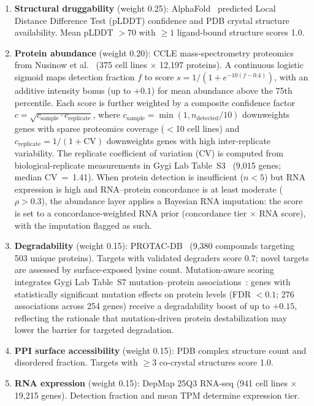 \documentclass[times, twoside, watermark]{zHenriquesLab-StyleBioRxiv}
\begin{document}
\begin{enumerate}
\item \textbf{Structural druggability} (weight 0.25): AlphaFold~\cite{Jumper2021} predicted Local Distance Difference Test (pLDDT) confidence and PDB crystal structure availability. Mean pLDDT $> 70$ with $\geq 1$ ligand-bound structure scores 1.0.
\item \textbf{Protein abundance} (weight 0.20): CCLE mass-spectrometry proteomics from Nusinow et al.~\cite{Nusinow2020} (375 cell lines $\times$ 12{,}197 proteins). A continuous logistic sigmoid maps detection fraction $f$ to score $s = 1/(1+e^{-10(f-0.4)})$, with an additive intensity bonus (up to $+0.1$) for mean abundance above the 75th percentile. Each score is further weighted by a composite confidence factor $c = \sqrt{c_{\text{sample}} \cdot c_{\text{replicate}}}$, where $c_{\text{sample}} = \min(1, n_{\text{detected}}/10)$ downweights genes with sparse proteomics coverage ($<$10 cell lines) and $c_{\text{replicate}} = 1/(1+\text{CV})$ downweights genes with high inter-replicate variability. The replicate coefficient of variation (CV) is computed from biological-replicate measurements in Gygi Lab Table~S3~\cite{Nusinow2020} (9{,}015 genes; median CV~=~1.41). When protein detection is insufficient ($n < 5$) but RNA expression is high and RNA--protein concordance is at least moderate ($\rho > 0.3$), the abundance layer applies a Bayesian RNA imputation: the score is set to a concordance-weighted RNA prior (concordance tier $\times$ RNA score), with the imputation flagged as such.
\item \textbf{Degradability} (weight 0.15): PROTAC-DB~\cite{Weng2021} (9{,}380 compounds targeting 503 unique proteins). Targets with validated degraders score 0.7; novel targets are assessed by surface-exposed lysine count. Mutation-aware scoring integrates Gygi Lab Table~S7 mutation--protein associations~\cite{Nusinow2020}: genes with statistically significant mutation effects on protein levels (FDR $< 0.1$; 276 associations across 254 genes) receive a degradability boost of up to $+0.15$, reflecting the rationale that mutation-driven protein destabilization may lower the barrier for targeted degradation.
\item \textbf{PPI surface accessibility} (weight 0.15): PDB complex structure count and disordered fraction. Targets with $\geq 3$ co-crystal structures score 1.0.
\item \textbf{RNA expression} (weight 0.15): DepMap 25Q3 RNA-seq (941 cell lines $\times$ 19{,}215 genes). Detection fraction and mean TPM determine expression tier.

\end{enumerate}
\end{document}
